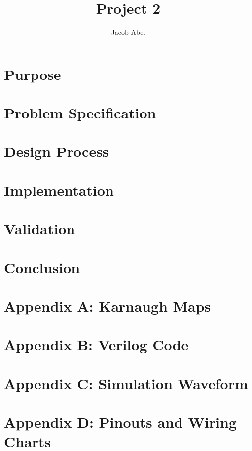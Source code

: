 \documentclass[12pt,letterpaper,titlepage]{article}
\author{Jacob Abel}
\title{Project 2}
\begin{document}
\maketitle


\tableofcontents
\pagebreak
\listoftables

\listoffigures

\pagebreak
\begin{raggedright}

\section{Purpose}

\section{Problem Specification}

\section{Design Process}

\section{Implementation}

\section{Validation}

\section{Conclusion}

\clearpage

\section{Appendix A: Karnaugh Maps}

\clearpage

\section{Appendix B: Verilog Code}

\clearpage

\section{Appendix C: Simulation Waveform}

\clearpage

\section{Appendix D: Pinouts and Wiring Charts}

\end{raggedright}
\end{document}
